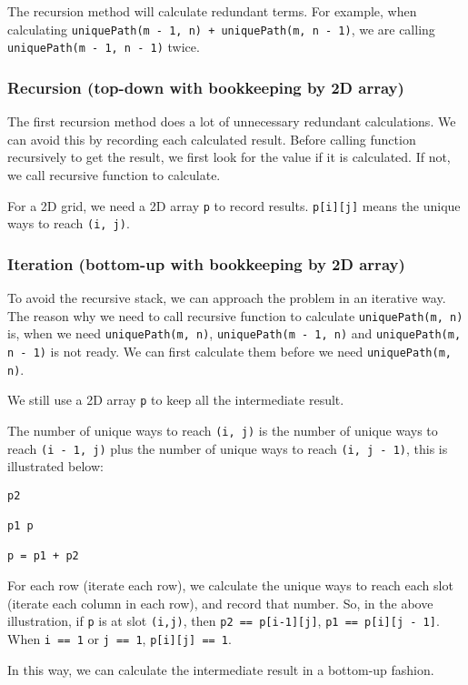 \documentclass[11pt]{article}
\begin{document}
The recursion method will calculate redundant terms. For example, when calculating \texttt{uniquePath(m - 1, n) + uniquePath(m, n - 1)}, we are calling \texttt{uniquePath(m - 1, n - 1)} twice.
\subsubsection{Recursion (top-down with bookkeeping by 2D array)}
\label{sec:org9b80dbe}
The first recursion method does a lot of unnecessary redundant calculations. We can avoid this by recording each calculated result. Before calling function recursively to get the result, we first look for the value if it is calculated. If not, we call recursive function to calculate.

For a 2D grid, we need a 2D array \texttt{p} to record results. \texttt{p[i][j]} means the unique ways to reach \texttt{(i, j)}.
\subsubsection{Iteration (bottom-up with bookkeeping by 2D array)}
\label{sec:orgacd4e2c}
To avoid the recursive stack, we can approach the problem in an iterative way. The reason why we need to call recursive function to calculate \texttt{uniquePath(m, n)} is, when we need \texttt{uniquePath(m, n)}, \texttt{uniquePath(m - 1, n)} and \texttt{uniquePath(m, n - 1)} is not ready. We can first calculate them before we need \texttt{uniquePath(m, n)}.

We still use a 2D array \texttt{p} to keep all the intermediate result.

The number of unique ways to reach \texttt{(i, j)} is the number of unique ways to reach \texttt{(i - 1, j)} plus the number of unique ways to reach \texttt{(i, j - 1)}, this is illustrated below:
\begin{Verbatim}[frame=single]
   p2

p1 p

p = p1 + p2
\end{Verbatim}
For each row (iterate each row), we calculate the unique ways to reach each slot (iterate each column in each row), and record that number. So, in the above illustration, if \texttt{p} is at slot \texttt{(i,j)}, then \texttt{p2 == p[i-1][j]}, \texttt{p1 == p[i][j - 1]}. When \texttt{i == 1} or \texttt{j == 1}, \texttt{p[i][j] == 1}.

In this way, we can calculate the intermediate result in a bottom-up fashion.
\end{document}
